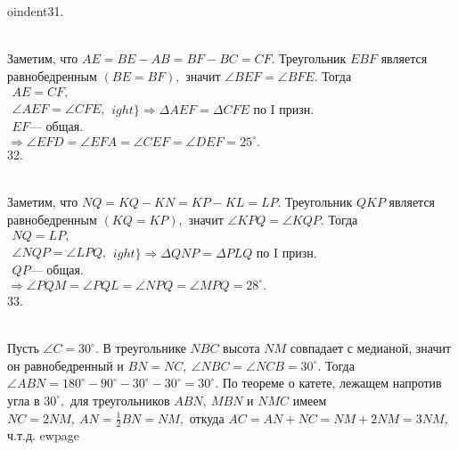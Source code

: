 oindent31. \begin{figure}[ht!]
\end{figure}\\
Заметим, что $AE=BE-AB=BF-BC=CF.$ Треугольник $EBF$ является равнобедренным $(BE=BF),$ значит $\angle BEF=\angle BFE.$ Тогда
$\left.\begin{array}{l}AE=CF,\\
\angle AEF=\angle CFE,\\
EF\text{--- общая.}  \end{array}
ight\}\Rightarrow \Delta AEF=\Delta CFE\text{ по I призн.}$\\$\Rightarrow \angle EFD=\angle EFA=\angle CEF=\angle DEF=25^\circ.$\\
32. \begin{figure}[ht!]
\end{figure}\\
Заметим, что $NQ=KQ-KN=KP-KL=LP.$ Треугольник $QKP$ является равнобедренным $(KQ=KP),$ значит $\angle KPQ=\angle KQP.$ Тогда
$\left.\begin{array}{l}NQ=LP,\\
\angle NQP=\angle LPQ,\\
QP\text{--- общая.}  \end{array}
ight\}\Rightarrow \Delta QNP=\Delta PLQ\text{ по I призн.}$\\$\Rightarrow \angle PQM=\angle PQL=\angle NPQ=\angle MPQ=28^\circ.$\\
33. \begin{figure}[ht!]
\end{figure}\\
Пусть $\angle C=30^\circ.$ В треугольнике $NBC$ высота $NM$ совпадает с медианой, значит он равнобедренный и $BN=NC,\ \angle NBC=\angle NCB=30^\circ.$ Тогда $\angle ABN=180^\circ-90^\circ-30^\circ-30^\circ=30^\circ.$ По теореме о катете, лежащем напротив угла в $30^\circ,$ для треугольников $ABN,\ MBN$ и $NMC$ имеем $NC=2NM,\ AN=\frac{1}{2}BN=NM,$ откуда $AC=AN+NC=NM+2NM=3NM,$ ч.т.д.
ewpage


